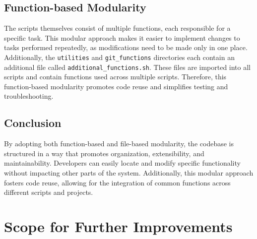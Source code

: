 \documentclass{article}
\begin{document}
\subsection{Function-based Modularity}

The scripts themselves consist of multiple functions, each responsible for a specific task. This modular approach makes it easier to implement changes to tasks performed repeatedly, as modifications need to be made only in one place. Additionally, the \texttt{utilities} and \texttt{git\_functions} directories each contain an additional file called \texttt{additional\_functions.sh}. These files are imported into all scripts and contain functions used across multiple scripts. Therefore, this function-based modularity promotes code reuse and simplifies testing and troubleshooting.

\subsection{Conclusion}

By adopting both function-based and file-based modularity, the codebase is structured in a way that promotes organization, extensibility, and maintainability. Developers can easily locate and modify specific functionality without impacting other parts of the system. Additionally, this modular approach fosters code reuse, allowing for the integration of common functions across different scripts and projects.

\section{Scope for Further Improvements}
\end{document}
